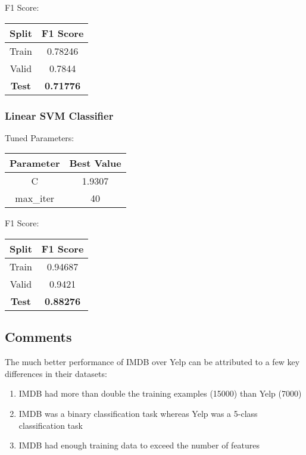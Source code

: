 \documentclass{article}
\begin{document}
F1 Score:
\begin{center}
\begin{tabular}{ |c|c| } 
	\hline
	\textbf{Split} & \textbf{F1 Score} \\ 
	\hline
	Train & 0.78246 \\
	Valid & 0.7844 \\ 
	\textbf{Test} & \textbf{0.71776} \\
	\hline
\end{tabular}
\end{center}

\subsubsection{Linear SVM Classifier}
Tuned Parameters:
\begin{center}
\begin{tabular}{ |c|c| } 
	\hline
	\textbf{Parameter} & \textbf{Best Value} \\ 
	\hline
	C & 1.9307 \\ 
    max\_iter & 40 \\
	\hline
\end{tabular}
\end{center}

F1 Score:
\begin{center}
\begin{tabular}{ |c|c| } 
	\hline
	\textbf{Split} & \textbf{F1 Score} \\ 
	\hline
	Train & 0.94687 \\
	Valid & 0.9421 \\ 
	\textbf{Test} & \textbf{0.88276} \\
	\hline
\end{tabular}
\end{center}

\subsection{Comments}
The much better performance of IMDB over Yelp can be attributed to a few key differences in their datasets: \\
\begin{enumerate}
	\item IMDB had more than double the training examples (15000) than Yelp (7000)
    \item IMDB was a binary classification task whereas Yelp was a 5-class classification task
    \item IMDB had enough training data to exceed the number of features
\end{enumerate}
\end{document}
